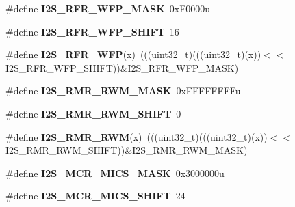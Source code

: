 \begin{DoxyCompactItemize}
\item 
\#define {\bfseries I2\+S\+\_\+\+R\+F\+R\+\_\+\+W\+F\+P\+\_\+\+M\+A\+SK}~0x\+F0000u\hypertarget{group__I2S__Register__Masks_ga14ca8fb387a14c562c2721c054f25acc}{}\label{group__I2S__Register__Masks_ga14ca8fb387a14c562c2721c054f25acc}

\item 
\#define {\bfseries I2\+S\+\_\+\+R\+F\+R\+\_\+\+W\+F\+P\+\_\+\+S\+H\+I\+FT}~16\hypertarget{group__I2S__Register__Masks_ga1890bc961298234e8516b19b4523bfb5}{}\label{group__I2S__Register__Masks_ga1890bc961298234e8516b19b4523bfb5}

\item 
\#define {\bfseries I2\+S\+\_\+\+R\+F\+R\+\_\+\+W\+FP}(x)~(((uint32\+\_\+t)(((uint32\+\_\+t)(x))$<$$<$I2\+S\+\_\+\+R\+F\+R\+\_\+\+W\+F\+P\+\_\+\+S\+H\+I\+FT))\&I2\+S\+\_\+\+R\+F\+R\+\_\+\+W\+F\+P\+\_\+\+M\+A\+SK)\hypertarget{group__I2S__Register__Masks_ga9f424cc6a0d2f577d7356b4abb83e43c}{}\label{group__I2S__Register__Masks_ga9f424cc6a0d2f577d7356b4abb83e43c}

\item 
\#define {\bfseries I2\+S\+\_\+\+R\+M\+R\+\_\+\+R\+W\+M\+\_\+\+M\+A\+SK}~0x\+F\+F\+F\+F\+F\+F\+F\+Fu\hypertarget{group__I2S__Register__Masks_ga72f2c1e6c8be00aa0227c8d924c3506a}{}\label{group__I2S__Register__Masks_ga72f2c1e6c8be00aa0227c8d924c3506a}

\item 
\#define {\bfseries I2\+S\+\_\+\+R\+M\+R\+\_\+\+R\+W\+M\+\_\+\+S\+H\+I\+FT}~0\hypertarget{group__I2S__Register__Masks_gaf69010ae59c583206d59a8cc0c681c04}{}\label{group__I2S__Register__Masks_gaf69010ae59c583206d59a8cc0c681c04}

\item 
\#define {\bfseries I2\+S\+\_\+\+R\+M\+R\+\_\+\+R\+WM}(x)~(((uint32\+\_\+t)(((uint32\+\_\+t)(x))$<$$<$I2\+S\+\_\+\+R\+M\+R\+\_\+\+R\+W\+M\+\_\+\+S\+H\+I\+FT))\&I2\+S\+\_\+\+R\+M\+R\+\_\+\+R\+W\+M\+\_\+\+M\+A\+SK)\hypertarget{group__I2S__Register__Masks_ga7c42aae38ae5b259cf5def11533ba076}{}\label{group__I2S__Register__Masks_ga7c42aae38ae5b259cf5def11533ba076}

\item 
\#define {\bfseries I2\+S\+\_\+\+M\+C\+R\+\_\+\+M\+I\+C\+S\+\_\+\+M\+A\+SK}~0x3000000u\hypertarget{group__I2S__Register__Masks_ga4c26e3cecbf702523474909a853e29b8}{}\label{group__I2S__Register__Masks_ga4c26e3cecbf702523474909a853e29b8}

\item 
\#define {\bfseries I2\+S\+\_\+\+M\+C\+R\+\_\+\+M\+I\+C\+S\+\_\+\+S\+H\+I\+FT}~24\hypertarget{group__I2S__Register__Masks_gabf7e721def09b1b0b95908cfafe51512}{}\label{group__I2S__Register__Masks_gabf7e721def09b1b0b95908cfafe51512}


\end{DoxyCompactItemize}
